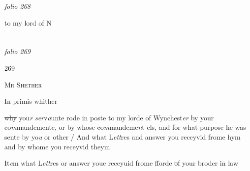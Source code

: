 \documentclass[12pt, a4paper]{book}
\begin{document}
\dotfill
						\newpage
{}

\textit{folio 268}


to my lord of N
			

\dotfill
						\newpage {} \section*{}  \subsection*{}

\textit{folio 269}



            		\begin{flushright}{\color{Mahogany}269}\end{flushright}


				\begin{center}  {\scshape Mr Shether}  \end{center}
			
            		
            			
				\marginpar[\vspace{0.5cm}{\textcolor{Gray}{1}}]{}
			

		\ifthenelse{\isodd{\thepage}}
		{\reversemarginpar}
		{\normalmarginpar}
		 In primis whither
			
               \sout{why} you\textit{r}
               \textit{ser}v\textit{a}unte rode in poste to my lorde of Wynchest\textit{er}
by your co\textit{m}mandemente, or by whose co\textit{m}mandeme\textit{n}t els, and
for what purpose he was sente by yo\textit{u} or other / And what
L\textit{ett}res and answer you receyvid frome hym and by whome
you receyvid theym
            		
            		
				\marginpar[\vspace{0.5cm}{\textcolor{Gray}{2}}]{}
			

		\ifthenelse{\isodd{\thepage}}
		{\reversemarginpar}
		{\normalmarginpar}
		 It\textit{e}m what L\textit{ett}res or answer youe receyuid frome fforde \sout{of 
               }
               your broder in law
			
\end{document}
